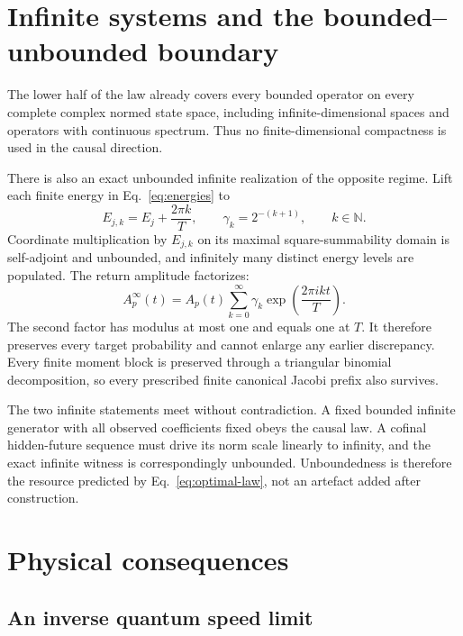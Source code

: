 \documentclass[10pt]{article}
\numberwithin{equation}{section}
\theoremstyle{definition}
\theoremstyle{remark}
\newcommand{\N}{\mathbb N}
\begin{document}
\section{Infinite systems and the bounded--unbounded boundary}

The lower half of the law already covers every bounded operator on every
complete complex normed state space, including infinite-dimensional spaces
and operators with continuous spectrum.  Thus no finite-dimensional
compactness is used in the causal direction.

There is also an exact unbounded infinite realization of the opposite
regime.  Lift each finite energy in Eq.~\eqref{eq:energies} to
\begin{equation}
 E_{j,k}=E_j+\frac{2\pi k}{T},\qquad
 \gamma_k=2^{-(k+1)},\qquad k\in\N .
\label{eq:ladder}
\end{equation}
Coordinate multiplication by \(E_{j,k}\) on its maximal square-summability
domain is self-adjoint and unbounded, and infinitely many distinct energy
levels are populated.  The return amplitude factorizes:
\begin{equation}
 A_p^\infty(t)=A_p(t)
 \sum_{k=0}^{\infty}\gamma_k
 \exp\!\left(\frac{2\pi i k t}{T}\right).
\label{eq:factor}
\end{equation}
The second factor has modulus at most one and equals one at \(T\).  It
therefore preserves every target probability and cannot enlarge any earlier
discrepancy.  Every finite moment block is preserved through a triangular
binomial decomposition, so every prescribed finite canonical Jacobi prefix
also survives.

The two infinite statements meet without contradiction.  A fixed bounded
infinite generator with all observed coefficients fixed obeys the causal
law.  A cofinal hidden-future sequence must drive its norm scale linearly to
infinity, and the exact infinite witness is correspondingly unbounded.
Unboundedness is therefore the resource predicted by Eq.~\eqref{eq:optimal-law},
not an artefact added after construction.

\section{Physical consequences}

\subsection{An inverse quantum speed limit}
\end{document}
